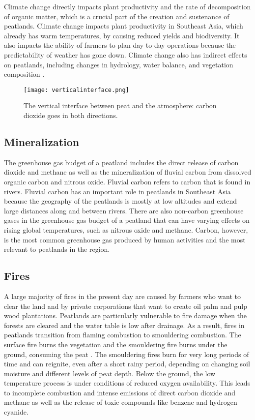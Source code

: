 Climate change directly impacts plant productivity and the rate of decomposition of organic matter, which is a crucial part of the creation and sustenance of peatlands. Climate change impacts plant productivity in Southeast Asia, which already has warm temperatures, by causing reduced yields and biodiversity. It also impacts the ability of farmers to plan day-to-day operations because the predictability of weather has gone down. Climate change also has indirect effects on peatlands, including changes in hydrology, water balance, and vegetation composition \citep{bonn2016peatland}.

\begin{figure}
 \texttt{[image: verticalinterface.png]}
  \caption{The vertical interface between peat and the atmosphere: carbon dioxide goes in both directions.}
  \label{fig:peatlandwatertable}
\end{figure}

\subsection{Mineralization}

The greenhouse gas budget of a peatland includes the direct release of carbon dioxide and methane as well as the mineralization of fluvial carbon from dissolved organic carbon and nitrous oxide. Fluvial carbon refers to carbon that is found in rivers. Fluvial carbon has an important role in peatlands in Southeast Asia because the geography of the peatlands is mostly at low altitudes and extend large distances along and between rivers. There are also non-carbon greenhouse gases in the greenhouse gas budget of a peatland that can have varying effects on rising global temperatures, such as nitrous oxide and methane. Carbon, however, is the most common greenhouse gas produced by human activities and the most relevant to peatlands in the region.   

\subsection{Fires}

A large majority of fires in the present day are caused by farmers who want to clear the land and by private corporations that want to create oil palm and pulp wood plantations. Peatlands are particularly vulnerable to fire damage when the forests are cleared and the water table is low after drainage. As a result, fires in peatlands transition from flaming combustion to smouldering combustion. The surface fire burns the vegetation and the smouldering fire burns under the ground, consuming the peat \citep{page2016line}. The smouldering fires burn for very long periods of time and can reignite, even after a short rainy period, depending on changing soil moisture and different levels of peat depth. Below the ground, the low temperature process is under conditions of reduced oxygen availability. This leads to incomplete combustion and intense emissions of direct carbon dioxide and methane as well as the release of toxic compounds like benzene and hydrogen cyanide. 


